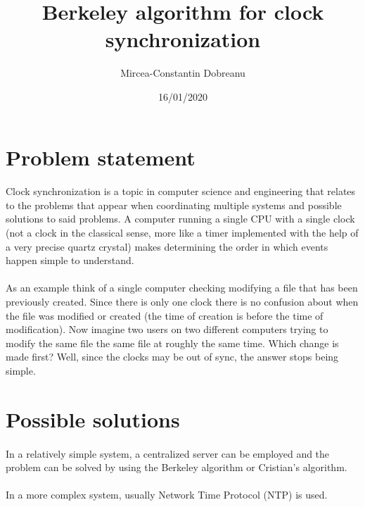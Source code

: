 \documentclass[12pt]{article}
\title{Berkeley algorithm for clock synchronization}
\author{Mircea-Constantin Dobreanu}
\date{16/01/2020}
\begin{document}
\maketitle


\section{Problem statement}

\paragraph{}
Clock synchronization is a topic in computer science and engineering that relates to the problems that appear when coordinating multiple systems and possible solutions to said problems. A computer running a single CPU with a single clock (not a clock in the classical sense, more like a timer implemented with the help of a very precise quartz crystal) makes determining the order in which events happen simple to understand. 
\paragraph{}
As an example think of a single computer checking modifying a file that has been previously created. Since there is only one clock there is no confusion about when the file was modified or created (the time of creation is before the time of modification). Now imagine two users on two different computers trying to modify the same file the same file at roughly the same time. Which change is made first? Well, since the clocks may be out of sync, the answer stops being simple.

\section{Possible solutions}

\paragraph{}
In a relatively simple system, a centralized server can be employed and the problem can be solved by using the Berkeley algorithm or Cristian's algorithm.

\paragraph{}
In a more complex system, usually Network Time Protocol (NTP) is used.
\end{document}
